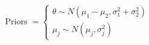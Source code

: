 \documentclass[preview]{standalone}
\begin{document}
\begin{align*}
\text{Priors } = \begin{cases}\theta \sim N(\mu_1 - \mu_2,\sigma_1^2 + \sigma_2^2) \\\mu_j \sim N(\mu_j,\sigma_j^2)\end{cases}
\end{align*}
\end{document}
